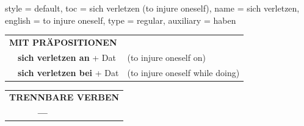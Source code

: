 \begin{verbentry}{
  style = {default},
  toc = {sich verletzen (to injure oneself)},
  name = {sich verletzen},
  english = {to injure oneself},
  type = {regular},
  auxiliary = {haben}
}
\vspace{10pt}

\begin{tabular}{lll}
\multicolumn{3}{l}{\textbf{MIT PRÄPOSITIONEN}}\\
& \textbf{sich verletzen an} + Dat & (to injure oneself on)\\
& \textbf{sich verletzen bei} + Dat & (to injure oneself while doing)\\
\end{tabular}
\hfill
\begin{tabular}{lll}
\multicolumn{3}{l}{\textbf{TRENNBARE VERBEN}}\\
& \textbf{---} & \\
\end{tabular}
\vspace{-5pt}
\end{verbentry}

